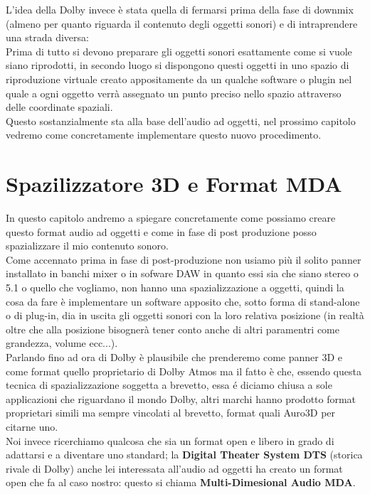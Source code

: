 \documentclass[12pt,a4paper]{report}
\begin{document}
L'idea della Dolby invece è stata quella di fermarsi prima della fase di downmix (almeno per quanto riguarda il contenuto degli oggetti sonori) e di intraprendere una strada diversa:\\

Prima di tutto si devono preparare gli oggetti sonori esattamente come si vuole siano riprodotti, in secondo luogo si dispongono questi oggetti in uno spazio di riproduzione virtuale creato appositamente da un qualche software o plugin nel quale a ogni oggetto verrà assegnato un punto preciso nello spazio attraverso delle coordinate spaziali.\\

Questo sostanzialmente sta alla base dell'audio ad oggetti, nel prossimo capitolo vedremo come concretamente implementare questo nuovo procedimento.



\chapter{Spazilizzatore 3D e Format MDA}\label{dolby}

In questo capitolo andremo a spiegare concretamente come possiamo creare questo format audio ad oggetti e come in fase di post produzione posso spazializzare il mio contenuto sonoro.\\

Come accennato prima in fase di post-produzione non usiamo più il solito panner installato in banchi mixer o in sofware DAW in quanto essi sia che siano stereo o 5.1 o quello che vogliamo, non hanno una spazializzazione a oggetti, quindi la cosa da fare è implementare un software apposito che, sotto forma di stand-alone o di plug-in, dia in uscita gli oggetti sonori con la loro relativa posizione (in realtà oltre che alla posizione bisognerà tener conto anche di altri paramentri come grandezza, volume ecc...).\\

Parlando fino ad ora di Dolby è plausibile che prenderemo come panner 3D e come format quello proprietario di Dolby Atmos ma il fatto è che, essendo questa tecnica di spazializzazione soggetta a brevetto, essa é diciamo chiusa a sole applicazioni che riguardano il mondo Dolby, altri marchi hanno prodotto format proprietari simili ma sempre vincolati al brevetto, format quali Auro3D per citarne uno.\\

Noi invece ricerchiamo qualcosa che sia un format open e libero in grado di adattarsi e a diventare uno standard; la \textbf{Digital Theater System DTS} (storica rivale di Dolby) anche lei interessata all'audio ad oggetti ha creato un format open che fa al caso nostro: questo si chiama \textbf{Multi-Dimesional Audio MDA}.\\
\end{document}
